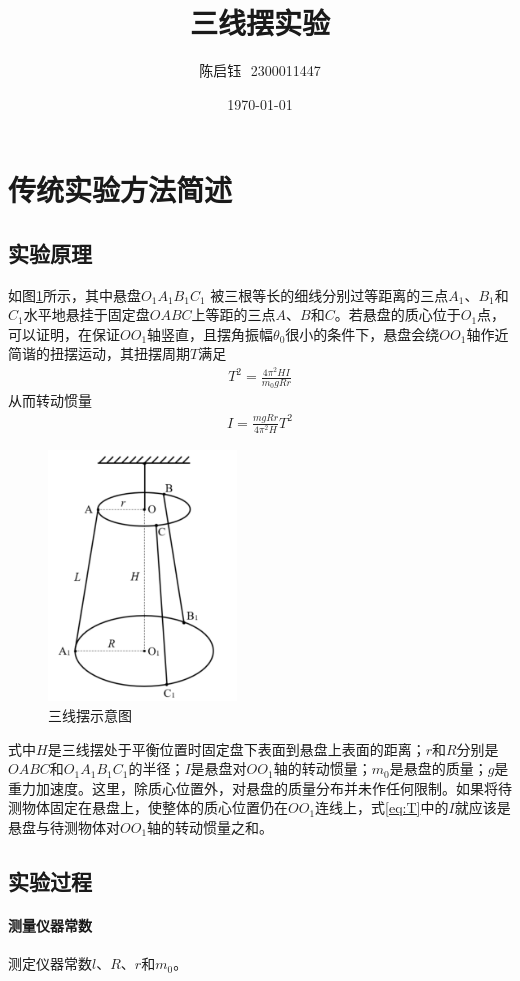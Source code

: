 \documentclass{ctexart}
\author{陈启钰\,\, 2300011447}
\title{三线摆实验}
\date{\today}
\begin{document}
	\maketitle
	\section{传统实验方法简述}
	\subsection{实验原理}
	如图\ref{fig:sxb}所示，其中悬盘$O_1A_1B_1C_1$ 被三根等长的细线分别过等距离的三点$A_1$、$B_1$和$C_1$水平地悬挂于固定盘$OABC$上等距的三点$A$、$B$和$C$。若悬盘的质心位于$O_1$点，可以证明，在保证$OO_1$轴竖直，且摆角振幅$\theta_0$很小的条件下，悬盘会绕$OO_1$轴作近简谐的扭摆运动，其扭摆周期$T$满足
	\begin{align}
		T^2=\frac{4\pi^2HI}{m_0gRr}
		\label{eq:T}
	\end{align}
	从而转动惯量
	\begin{align}
		I=\frac{mgRr}{4\pi^2H}T^2
	\end{align}
	\begin{figure}[H]
		\centering
		\includegraphics[width=5cm]{sxb.png}
		\caption{三线摆示意图}
		\label{fig:sxb}
	\end{figure}
	式中$H$是三线摆处于平衡位置时固定盘下表面到悬盘上表面的距离；$r$和$R$分别是$OABC$和$O_1A_1B_1C_1$的半径；$I$是悬盘对$OO_1$轴的转动惯量；$m_0$是悬盘的质量；$g$是重力加速度。这里，除质心位置外，对悬盘的质量分布并未作任何限制。如果将待测物体固定在悬盘上，使整体的质心位置仍在$OO_1$连线上，式\ref{eq:T}中的$I$就应该是悬盘与待测物体对$OO_1$轴的转动惯量之和。
	\subsection{实验过程}
	\paragraph{测量仪器常数}测定仪器常数$l$、$R$、$r$和$m_0$。
\end{document}
